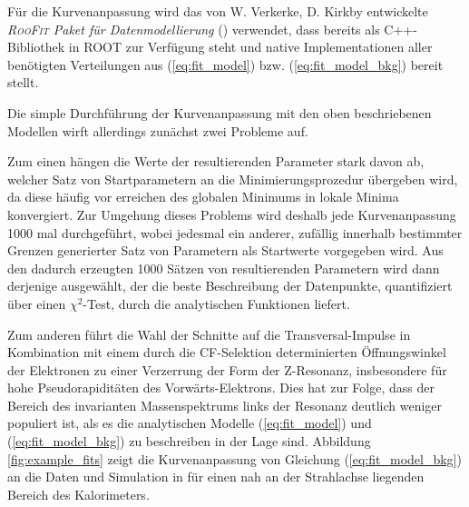 Für die Kurvenanpassung wird das von W. Verkerke, D. Kirkby entwickelte
\textit{\textsc{RooFit} Paket für Datenmodellierung} (\cite{Verkerke:2003ir})
verwendet, dass bereits als \textsc{C++}-Bibliothek in \textsc{ROOT} zur
Verfügung steht und native Implementationen aller benötigten Verteilungen aus
(\ref{eq:fit_model}) bzw. (\ref{eq:fit_model_bkg}) bereit stellt.

Die simple Durchführung der Kurvenanpassung mit den oben beschriebenen Modellen
wirft allerdings zunächst zwei Probleme auf.

Zum einen hängen die Werte der resultierenden Parameter stark davon ab, welcher
Satz von Startparametern an die Minimierungsprozedur übergeben wird, da diese
häufig vor erreichen des globalen Minimums in lokale Minima konvergiert. Zur
Umgehung dieses Problems wird deshalb jede Kurvenanpassung 1000 mal
durchgeführt, wobei jedesmal ein anderer, zufällig innerhalb bestimmter Grenzen
generierter Satz von Parametern als Startwerte vorgegeben wird. Aus den dadurch
erzeugten 1000 Sätzen von resultierenden Parametern wird dann derjenige
ausgewählt, der die beste Beschreibung der Datenpunkte, quantifiziert über
einen $\chi^2$-Test, durch die analytischen Funktionen liefert.

Zum anderen führt die Wahl der Schnitte auf die Transversal-Impulse in
Kombination mit einem durch die \ac{CF}-Selektion determinierten Öffnungswinkel
der Elektronen zu einer Verzerrung der Form der Z-Resonanz, insbesondere für
hohe Pseudorapiditäten des Vorwärts-Elektrons. Dies hat zur Folge, dass der
Bereich des invarianten Massenspektrums links der Resonanz deutlich weniger
populiert ist, als es die analytischen Modelle (\ref{eq:fit_model}) und
(\ref{eq:fit_model_bkg}) zu beschreiben in der Lage sind. Abbildung
\ref{fig:example_fits} zeigt die Kurvenanpassung von Gleichung
(\ref{eq:fit_model_bkg}) an die Daten und Simulation in für einen nah an der
Strahlachse liegenden Bereich des Kalorimeters.

